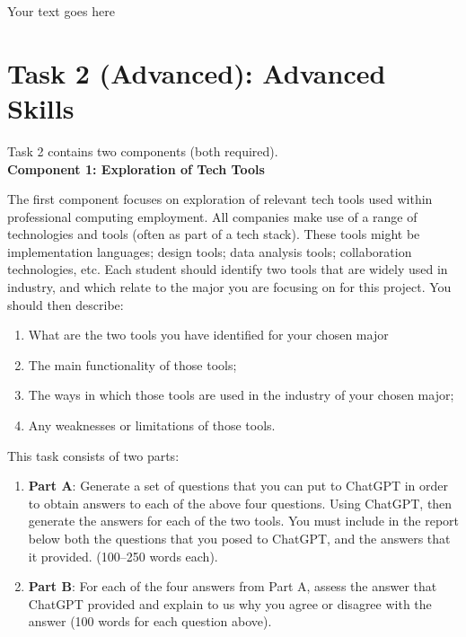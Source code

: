 \documentclass[a4paper, 11pt]{report}
\begin{document}
Your text goes here



\newpage
\section{Task 2 (Advanced): Advanced Skills}

Task 2 contains two components (both required).\\[2mm]

\textbf{Component 1: Exploration of Tech Tools}

The first component focuses on exploration of relevant tech tools used within professional computing employment. All companies make use of a range of technologies and tools (often as part of a tech stack). These tools might be implementation languages; design tools; data analysis tools; collaboration technologies, etc. Each student should identify two tools that are widely used in industry, and which relate to the major you are focusing on for this project. You should then describe:

\begin{enumerate}
\item What are the two tools you have identified for your chosen major
\item The main functionality of those tools;
\item The ways in which those tools are used in the industry of your chosen major;
\item Any weaknesses or limitations of those tools.
\end{enumerate}

This task consists of two parts:

\begin{enumerate}
\item \textbf{Part A}: Generate a set of questions that you can put to ChatGPT in order to obtain answers to each of the above four questions. Using ChatGPT, then generate the answers for each of the two tools. You must include in the report below both the questions that you posed to ChatGPT, and the answers that it provided.  (100–250 words each).
\item \textbf{Part B}: For each of the four answers from Part A, assess the answer that ChatGPT provided and explain to us why you agree or disagree with the answer (100 words for each question above).
\end{enumerate}
\end{document}
